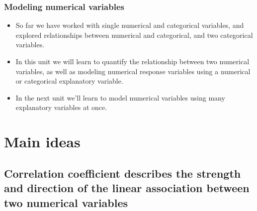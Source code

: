 \documentclass[slidestop,compress,mathserif,12pt,t,professionalfonts,xcolor=table]{beamer}
\begin{document}

\begin{frame}
\frametitle{Modeling numerical variables}

\begin{itemize}

\item So far we have worked with single numerical and categorical variables, and explored relationships between numerical and categorical, and two categorical variables.

\item In this unit we will learn to quantify the relationship between two numerical variables, as well as modeling numerical response variables using a numerical or categorical explanatory variable.

\item In the next unit we'll learn to model numerical variables using many explanatory variables at once.

\end{itemize}

\end{frame}


\section{Main ideas}


\subsection{Correlation coefficient describes the strength and direction of the linear association between two numerical variables}
\label{mi1}

\end{document}
